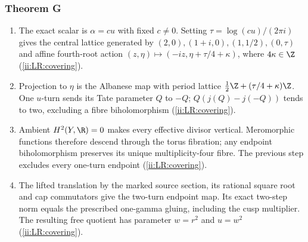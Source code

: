 \subsubsection*{Theorem G}
\begin{enumerate}[label=\arabic*.,leftmargin=*]
\item\hypertarget{step-II-G-1}{} The exact scalar is $\alpha=cu$
with fixed $c\ne0$. Setting $\tau=\log(cu)/(2\pi i)$ gives
the central lattice generated by $(2,0),(1+i,0),(1,1/2),(0,\tau)$
and affine fourth-root action
$(z,\eta)\mapsto(-iz,\eta+\tau/4+\kappa)$, where
$4\kappa\in\Z$ (\hyperref[ii:LR:covering]{\ref*{ii:LR:covering}}).
\item\hypertarget{step-II-G-2}{} Projection to $\eta$ is the
Albanese map with period lattice
$\tfrac12\Z+(\tau/4+\kappa)\Z$. One $u$-turn sends its
Tate parameter $Q$ to $-Q$; $Q(j(Q)-j(-Q))$ tends to two,
excluding a fibre biholomorphism
(\hyperref[ii:LR:covering]{\ref*{ii:LR:covering}}).
\item\hypertarget{step-II-G-3}{} Ambient $H^2(Y,\R)=0$ makes
every effective divisor vertical. Meromorphic functions therefore
descend through the torus fibration; any endpoint biholomorphism
preserves its unique multiplicity-four fibre. The previous step
excludes every one-turn endpoint
(\hyperref[ii:LR:covering]{\ref*{ii:LR:covering}}).
\item\hypertarget{step-II-G-4}{} The lifted translation by the
marked source section, its rational square root and cap
commutators give the two-turn endpoint map. Its exact two-step
norm equals the prescribed one-gamma gluing, including the cusp
multiplier. The resulting free quotient has parameter
$w=r^2$ and $u=w^2$
(\hyperref[ii:LR:covering]{\ref*{ii:LR:covering}}).
\end{enumerate}
